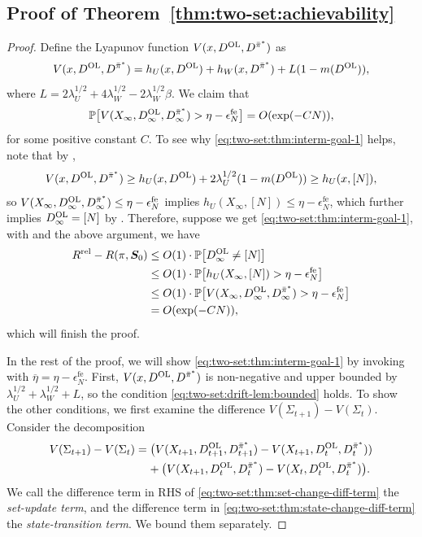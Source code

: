 \documentclass[11pt,letterpaper]{article}
\theoremstyle{plain}
\theoremstyle{definition}
\theoremstyle{remark}
\newcommand{\Probbig}[1]{\mathbb{P}\big[#1\big]}
\newcommand{\ve}[1]{\bm{#1}}
\newcommand{\veS}{\ve{S}}
\newcommand{\rel}{\textup{rel}} %
\newcommand{\ravg}{R}
\newcommand{\rsysn}{\ravg(\pi, \veS_0)}
\newcommand{\rrel}{\ravg^\rel}
\newcommand{\pibar}{{\sysbar{\pi}}}
\newcommand{\pibs}{{\pibar^*}}
\newcommand{\sysbar}[1]{\bar{#1}}
\newcommand{\threshbar}{\overline{\eta}}
\newcommand{\wmat}{W}
\newcommand{\umat}{U}
\newcommand{\errfe}{\epsilon_N^{\text{fe}}}
\newcommand{\hw}{h_\wmat}
\newcommand{\hu}{h_\umat}
\newcommand{\lamw}{\lambda_\wmat}
\newcommand{\lamu}{\lambda_\umat}
\newcommand{\Da}{D^{\pibs}}
\newcommand{\Db}{D^{\textup{OL}}}
\newcommand{\Ltemp}{L}
\newcommand{\Fullstate}{\Sigma}
\begin{document}
\subsection{Proof of Theorem~\ref{thm:two-set:achievability}}
\label{sec:two-set:pf-theorem}


\begin{proof}%
Define the Lyapunov function $V(x, \Db, \Da)$ as
\begin{equation}\label{eq:two-set:full-lyapunov}
    V(x, \Db, \Da) = \hu(x, \Db) + \hw(x, \Da) + \Ltemp (1 - m(\Db)),
\end{equation}
where $L = 2\lamu^{1/2} + 4\lamw^{1/2} - 2\lamw^{1/2}\beta$. 
We claim that
\begin{equation}
    \label{eq:two-set:thm:interm-goal-1}
    \Probbig{V(X_\infty, \Db_\infty, \Da_\infty) > \eta - \errfe} = O(\exp(-CN)),
\end{equation}
for some positive constant $C$. 
To see why \eqref{eq:two-set:thm:interm-goal-1} helps, note that by , 
\[
    V(x, \Db, \Da) \geq  \hu(x, \Db) + 2\lamu^{1/2} (1 - m(\Db)) \geq \hu(x, [N]),
\]
so $V(X_\infty, \Db_\infty, \Da_\infty) \leq \eta - \errfe$ implies $\hu(X_\infty, [N]) \leq \eta - \errfe$, which further implies $\Db_\infty =[N]$ by . Therefore, suppose we get \eqref{eq:two-set:thm:interm-goal-1}, with  and the above argument, we have
\begin{align*}
    \rrel - \rsysn     
    &\leq O(1)\cdot \Probbig{\Db_\infty \neq [N]} \\
    &\leq O(1)\cdot \Probbig{\hu(X_\infty, [N]) > \eta - \errfe} \\
    &\leq O(1)\cdot \Probbig{V(X_\infty, \Db_\infty, \Da_\infty) > \eta - \errfe} \\
    &= O(\exp(-CN)),
\end{align*}
which will finish the proof. 

In the rest of the proof, we will show \eqref{eq:two-set:thm:interm-goal-1} by invoking  with $\threshbar = \eta - \errfe$. 
First, $V(x, \Db, \Da)$ is non-negative and upper bounded by $\lamu^{1/2}+\lamw^{1/2} + \Ltemp$, so the condition \eqref{eq:two-set:drift-lem:bounded} holds. To show the other conditions, we first examine the difference $V(\Fullstate_{t+1}) - V(\Fullstate_t)$. 
Consider the decomposition 
\begin{align}
    V(\Fullstate_{t+1}) - V(\Fullstate_t) 
    \label{eq:two-set:thm:set-change-diff-term}
    &= \big(V(X_{t+1}, \Db_{t+1}, \Da_{t+1}) - V(X_{t+1}, \Db_{t}, \Da_{t}))  \\
    \label{eq:two-set:thm:state-change-diff-term}
    &\mspace{20mu} + \big(V(X_{t+1}, \Db_{t}, \Da_{t}) -  V(X_{t}, \Db_{t}, \Da_{t})\big). 
\end{align}
We call the difference term in RHS of \eqref{eq:two-set:thm:set-change-diff-term} the \emph{set-update term}, and the difference term in \eqref{eq:two-set:thm:state-change-diff-term} the \emph{state-transition term}. 
We bound them separately. 


\end{proof}
\end{document}
